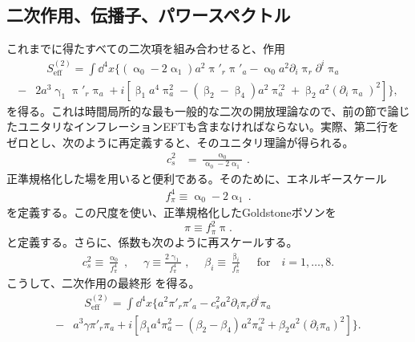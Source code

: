 \documentclass[a4paper,11pt,oneside]{article}
\theoremstyle{definition}
\numberwithin{equation}{section}
\newcommand{\pir}{\pi_{r}}
\newcommand{\pia}{\pi_{a}}
\begin{document}
\subsection{二次作用、伝播子、パワースペクトル}



これまでに得たすべての二次項を組み合わせると、作用
\begin{align}
&\quad S_{\mathrm{eff}}^{(2)} = \int \dd^4 x \Big\{\left( \upalpha_0 -2 \upalpha_1\right) a^2 \uppi'_{r} \uppi'_{a} - \upalpha_0 a^2 \partial_i \uppi_{r}  \partial^i \uppi_{a}   \\
-& 2 a^3 \upgamma_1 \uppi'_{r} \uppi_a + i \left[\upbeta_1 a^4 \uppi_a^2 - \left(\upbeta_2 - \upbeta_4\right) a^2\uppi_a^{\prime2} + \upbeta_2 a^2 \left(\partial_i \uppi_{a} \right)^2\right] \Big\}, \nonumber
\end{align}
を得る。これは時間局所的な最も一般的な二次の開放理論なので、前の節で論じたユニタリなインフレーションEFTも含まなければならない。実際、第二行をゼロとし、次のように再定義すると、そのユニタリ理論が得られる。
\begin{align}
c_{s}^{2} &= \frac{\upalpha_0}{\upalpha_{0}-2\upalpha_1} \,.
\end{align}
正準規格化した場を用いると便利である。そのために、エネルギースケール
\begin{align}
f_\pi^4 \equiv \upalpha_0 -2 \upalpha_1\,.
\end{align}
を定義する。この尺度を使い、正準規格化したGoldstoneボソンを
\begin{equation}\label{eq:can}
\pi \equiv f_\pi^2 \uppi.
\end{equation}
と定義する。さらに、係数も次のように再スケールする。
\begin{align}
c_s^{2} \equiv \frac{\upalpha_{0}}{f_\pi^4}\;,\quad\; \gamma \equiv
\frac{2\upgamma_{1}}{f_\pi^4}\;,\quad\;\beta_{i} \equiv \frac{\upbeta_{i}}{f_{\pi}^{4}}\;\quad\mathrm{for}\quad i = 1, \ldots, 8.
\end{align}
こうして、二次作用の最終形
を得る。
\begin{align}\label{eq:canonorm} 
&\quad S_{\mathrm{eff}}^{(2)} = \int \dd^4 x \Big\{ a^2 \pi'_{r} \pi'_{a} - c_{s}^{2} a^2 \partial_i \pir  \partial^i \pia  \\
-&  a^3 \gamma \pi'_{r} \pia + i \left[\beta_{1} a^4 \pia^2 - \left(\beta_2 - \beta_4\right) a^2\pia^{\prime 2} + \beta_2 a^2 \left(\partial_i \pia \right)^2\right] \Big\}. \nonumber
\end{align}
\end{document}
